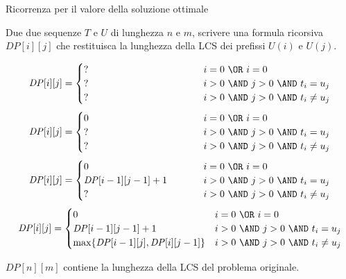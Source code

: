 \begin{frame}{Ricorrenza per il \alert{valore} della soluzione ottimale}

\vspace{-9pt}
\begin{myboxtitle}
Due due sequenze $T$ e $U$ di lunghezza $n$ e $m$, scrivere una formula
ricorsiva $\mathit{DP}[i][j]$ che restituisca la \alert{lunghezza} della LCS dei prefissi $U(i)$ e $U(j)$.
\end{myboxtitle}

\begingroup
\small
\begin{overprint}
\[
  \mathit{DP}[i][j] = \begin{cases}
   \makebox[4cm][l]{?} & i=0\ \OR\ i=0 \\
   \makebox[4cm][l]{?} & i>0\ \AND\ j>0\ \AND\ t_i = u_j \\
   \makebox[4cm][l]{?} & i>0\ \AND\ j>0\ \AND\ t_i \neq u_j
  \end{cases}
\]
\[
  \mathit{DP}[i][j] = \begin{cases}
   0 & i=0\ \OR\ i=0 \\
   \makebox[4cm][l]{?} & i>0\ \AND\ j>0\ \AND\ t_i = u_j \\
   \makebox[4cm][l]{?} & i>0\ \AND\ j>0\ \AND\ t_i \neq u_j
  \end{cases}
\]
\[
  \mathit{DP}[i][j] = \begin{cases}
   0 & i=0\ \OR\ i=0 \\
   \mathit{DP}[i-1][j-1]+1 & i>0\ \AND\ j>0\ \AND\ t_i = u_j \\
   \makebox[4cm][l]{?} & i>0\ \AND\ j>0\ \AND\ t_i \neq u_j
  \end{cases}
\]
\[
  \mathit{DP}[i][j] = \begin{cases}
   0 & i=0\ \OR\ i=0 \\
   \mathit{DP}[i-1][j-1]+1 & i>0\ \AND\ j>0\ \AND\ t_i = u_j \\
   \max \{ \mathit{DP}[i-1][j], \mathit{DP}[i][j-1] \} & i>0\ \AND\ j>0\ \AND\ t_i \neq u_j
  \end{cases}
\]
\end{overprint}
\endgroup

\bigskip
{}

\smallskip
$\mathit{DP}[n][m]$ contiene la lunghezza della LCS del problema originale.

\end{frame}

